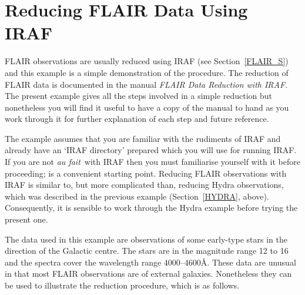 \documentclass[chapters,twoside,11pt]{starlink}
\begin{document}
\newpage
\section{\label{FLAIR}Reducing FLAIR Data Using IRAF}

FLAIR observations are usually reduced using IRAF (see
Section~\ref{FLAIR_S}) and this example is a simple demonstration
of the procedure.  The reduction of FLAIR data is documented
in the manual \textit{FLAIR Data Reduction with
IRAF}\/\cite{DRINK96}.  The present example gives all the steps
involved in a simple reduction but nonetheless you will find it
useful to have a copy of the manual to hand as you work through
it for further explanation of each step and future reference.

The example assumes that you are familiar with the rudiments
of IRAF and already have an `IRAF directory' prepared which
you will use for running IRAF.  If you are not \textit{au fait}\, with
IRAF then you must familiarise yourself with it before proceeding;
\/\cite{SG12}
is a convenient starting point.  Reducing FLAIR observations with
IRAF is similar to, but more complicated than, reducing Hydra
observations, which was described in the previous example
(Section~\ref{HYDRA}, above).  Consequently, it is sensible to work
through the Hydra example before trying the present one.

The data used in this example are observations of some early-type
stars in the direction of the Galactic centre.  The stars are in
the magnitude range 12 to 16 and the spectra cover the wavelength
range 4000--4600\AA.  These data are unusual in that most FLAIR
observations are of external galaxies.  Nonetheless they can be used
to illustrate the reduction procedure, which is as follows.
\end{document}
